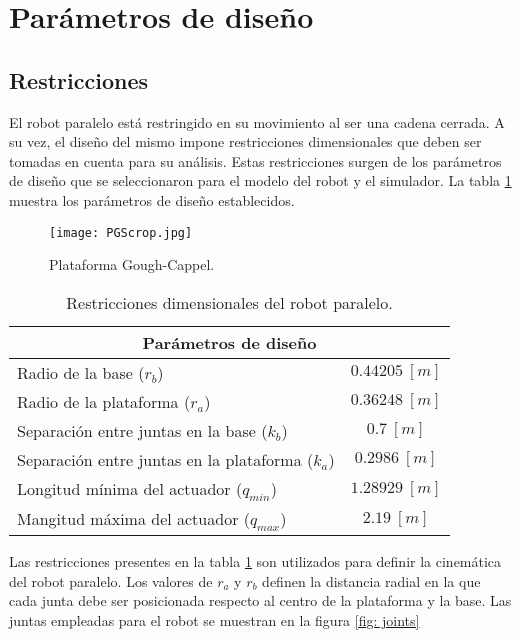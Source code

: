 \section{Parámetros de diseño}

\subsection{Restricciones}
El robot paralelo está restringido en su movimiento 
al ser una cadena cerrada.
A su vez, el diseño del mismo impone restricciones dimensionales 
que deben ser tomadas en cuenta para su análisis.
Estas restricciones surgen de los parámetros de diseño que 
se seleccionaron para el modelo del robot y el simulador.
La tabla \ref{tab: restricciones} muestra los 
parámetros de diseño establecidos.

\begin{figure}
 \centering
 \texttt{[image: PGScrop.jpg]}
 \caption{Plataforma Gough-Cappel.}
 \label{fig: cad}
\end{figure}


\begin{table}[htb!]
\centering
\begin{tabular}{lc}

\multicolumn{2}{c}{Parámetros de diseño} \\ \hline
Radio de la base ($r_b$) & $0.44205 \ [m]$ \\ 
Radio de la plataforma ($r_a$) & $0.36248 \ [m]$ \\ 
Separación entre juntas en la base ($k_b$) & $0.7 \ [m]$ \\ 
Separación entre juntas en la plataforma ($k_a$) & $0.2986 \ [m]$ \\ 
Longitud mínima del actuador ($q_{min}$) & $1.28929 \ [m]$ \\ 
Mangitud máxima del actuador ($q_{max}$) &  $2.19 \ [m]$ \\ 
\end{tabular}
\caption{Restricciones dimensionales del robot paralelo.}
\label{tab: restricciones}
\end{table}

Las restricciones presentes en la tabla \ref{tab: restricciones}
son utilizados para definir la cinemática del robot paralelo.
Los valores de $r_a$ y $r_b$ definen la 
distancia radial en la que cada junta debe ser 
posicionada respecto al centro de la plataforma y la base.
Las juntas empleadas para el robot se muestran 
en la figura \ref{fig: joints}

